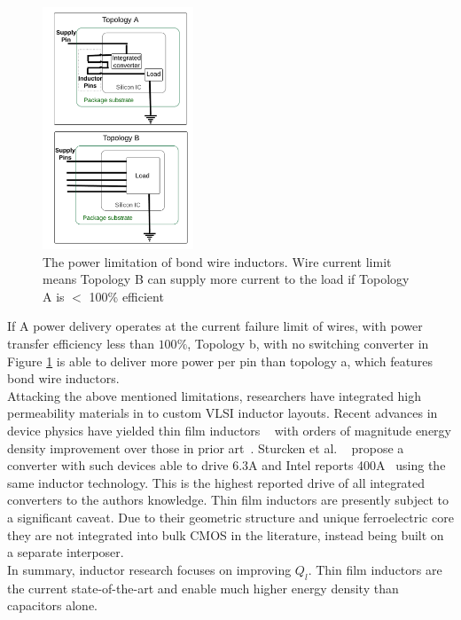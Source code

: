 \documentclass[letterpaper,twocolumn,10pt]{article}
\begin{document}
\begin{figure}[here]
\includegraphics[width=0.4\textwidth]{BondWireInductorLimit}
\caption{The power limitation of bond wire inductors. Wire current limit means Topology B can supply more current to the load if Topology A is $<$ 100\% efficient}
\label{BondWireLim}
\end{figure}

If A power delivery operates at the current failure limit of wires, with power transfer efficiency less than $100 \%$, Topology b, with no switching converter in Figure \ref{BondWireLim} is able to deliver more power per pin than topology a, which features bond wire inductors.\\
\indent Attacking the above mentioned limitations, researchers have integrated high permeability materials in to custom VLSI inductor layouts. Recent advances in device physics have yielded thin film inductors ~\cite{OSulivan2013} with orders of magnitude energy density improvement over those in prior art~\cite{Meere2009}. Sturcken et al. ~\cite{Sturcken2013} propose a converter with such devices able to drive 6.3A and Intel reports 400A~\cite{Intel2010} using the same inductor technology. This is the highest reported drive of all integrated converters to the authors knowledge. Thin film inductors are presently subject to a significant caveat. Due to their geometric structure and unique ferroelectric core they are not integrated into bulk CMOS in the literature, instead being built on a separate interposer.\\
\indent In summary, inductor research focuses on improving $Q_l$. Thin film inductors are the current state-of-the-art and enable much higher energy density than capacitors alone.\\
\end{document}
